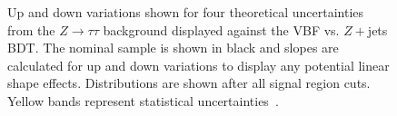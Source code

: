 \begin{figure}[!h]
{  }\hfill
{\caption{Up and down variations shown for four theoretical uncertainties from the $Z\rightarrow\tau\tau$ background displayed against the VBF vs. $Z+$jets BDT. The nominal sample is shown in black and slopes are calculated for up and down variations to display any potential linear shape effects. Distributions are shown after all signal region cuts. Yellow bands represent statistical uncertainties~\cite{ourSupportNote}.
\label{fig:ztttheor}}}
\end{figure}
